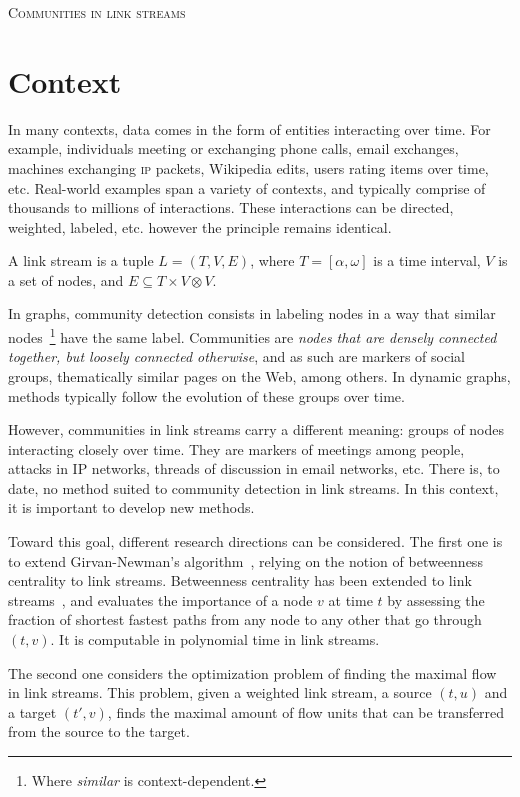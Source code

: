 \documentclass[a4paper, 12pt]{article}
\newcommand{\dest}{ 
    \textsc{\Huge Communities in link streams}
}
\begin{document}
\pagestyle{fancy} 

\addvspace{1cm}
\begin{center}
  \dest
\end{center}

\addvspace{1cm}

\section{Context}

In many contexts, data comes in the form of entities interacting over time.
For example, individuals meeting or exchanging phone calls, email exchanges, machines exchanging \textsc{ip} packets, Wikipedia edits, users rating items over time, etc.
Real-world examples span a variety of contexts, and typically comprise of thousands to millions of interactions.
These interactions can be directed, weighted, labeled, etc. however the principle remains identical. 

A link stream is a tuple $L=(T,V,E)$, where $T=[\alpha, \omega]$ is a time interval, $V$ is a set of nodes, and $E\subseteq T\times V\otimes V$.

In graphs, community detection consists in labeling nodes in a way that similar nodes~\footnote{Where {\em similar} is context-dependent.} have the same label.
Communities are {\em nodes that are densely connected together, but loosely connected otherwise}, and as such are markers of social groups, thematically similar pages on the Web, among others.
In dynamic graphs, methods typically follow the evolution of these groups over time.

However, communities in link streams carry a different meaning: groups of nodes interacting closely over time.
They are markers of meetings among people, attacks in IP networks, threads of discussion in email networks, etc.
There is, to date, no method suited to community detection in link streams.
In this context, it is important to develop new methods.

Toward this goal, different research directions can be considered.
The first one is to extend Girvan-Newman's algorithm~\cite{}, relying on the notion of betweenness centrality to link streams.
Betweenness centrality has been extended to link streams~\cite{}, and evaluates the importance of a node $v$ at time $t$ by assessing the fraction of shortest fastest paths from any node to any other that go through $(t,v)$.
It is computable in polynomial time in link streams.

The second one considers the optimization problem of finding the maximal flow in link streams.
This problem, given a weighted link stream, a source $(t,u)$ and a target $(t',v)$, finds the maximal amount of flow units that can be transferred from the source to the target.
\end{document}
